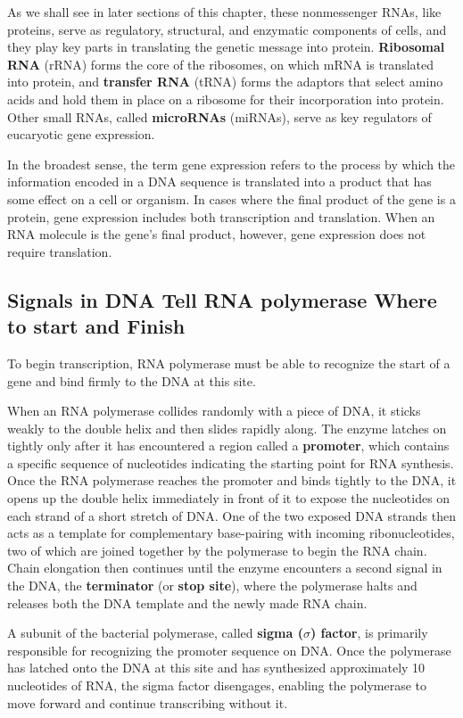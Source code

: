 As we shall see in later sections of this chapter, these nonmessenger RNAs,
like proteins, serve as regulatory, structural, and enzymatic components
of cells, and they play key parts in translating the genetic message into
protein. \textbf{Ribosomal RNA} (rRNA) forms the core of the ribosomes, on which
mRNA is translated into protein, and \textbf{transfer RNA} (tRNA) forms the adaptors
that select amino acids and hold them in place on a ribosome for
their incorporation into protein. Other small RNAs, called \textbf{microRNAs}
(miRNAs), serve as key regulators of eucaryotic gene expression.

In the broadest sense, the term gene expression refers to the process
by which the information encoded in a DNA sequence is translated into
a product that has some effect on a cell or organism. In cases where
the final product of the gene is a protein, gene expression includes both
transcription and translation. When an RNA molecule is the gene’s final
product, however, gene expression does not require translation.

\subsection{Signals in DNA Tell RNA polymerase Where to start and Finish}

To begin transcription, RNA polymerase must be able to recognize the start of
a gene and bind firmly to the DNA at this site.

When an RNA polymerase collides randomly with a piece of DNA,
it sticks weakly to the double helix and then slides rapidly along. The
enzyme latches on tightly only after it has encountered a region called a
\textbf{promoter}, which contains a specific sequence of nucleotides indicating
the starting point for RNA synthesis. Once the RNA polymerase reaches
the promoter and binds tightly to the DNA, it opens up the double helix
immediately in front of it to expose the nucleotides on each strand of a
short stretch of DNA. One of the two exposed DNA strands
then acts as a template for complementary base-pairing with incoming
ribonucleotides, two of which are joined together by the polymerase to
begin the RNA chain. Chain elongation then continues until the enzyme
encounters a second signal in the DNA, the \textbf{terminator} (or \textbf{stop site}),
where the polymerase halts and releases both the DNA template and the
newly made RNA chain.

A subunit of the bacterial polymerase, called \textbf{sigma ($\sigma$) factor}, is primarily
responsible for recognizing the promoter sequence on DNA. Once the
polymerase has latched onto the DNA at this site and has synthesized
approximately 10 nucleotides of RNA, the sigma factor disengages, enabling
the polymerase to move forward and continue transcribing without it.

